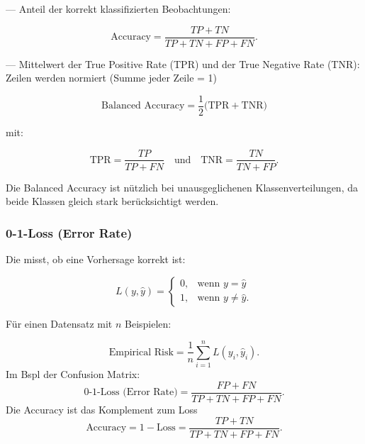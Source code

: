 \begin{formulabox}
 — Anteil der korrekt klassifizierten Beobachtungen:

\begin{equation}
\text{Accuracy} = \frac{TP + TN}{TP + TN + FP + FN}.
\end{equation}
\end{formulabox}

\begin{formulabox}
 — Mittelwert der True Positive Rate (TPR) und der True Negative Rate (TNR):
Zeilen werden normiert (Summe jeder Zeile = 1)

\begin{equation}
\text{Balanced Accuracy} = \frac{1}{2} \big( \text{TPR} + \text{TNR} \big)
\end{equation}

mit:

\begin{equation}
\text{TPR} = \frac{TP}{TP + FN}
\quad \text{und} \quad
\text{TNR} = \frac{TN}{TN + FP}.
\end{equation}
\end{formulabox}

\begin{statementbox}[Hinweis]
Die Balanced Accuracy ist nützlich bei unausgeglichenen Klassenverteilungen, da beide Klassen gleich stark berücksichtigt werden.
\end{statementbox}



\subsubsection{0-1-Loss (Error Rate)}
\begin{contentbox}


Die  misst, ob eine Vorhersage korrekt ist:

\begin{equation}
L(y, \hat{y}) =
\begin{cases}
0, & \text{wenn } y = \hat{y} \\
1, & \text{wenn } y \neq \hat{y}.
\end{cases}
\end{equation}

Für einen Datensatz mit $n$ Beispielen:

\begin{equation}
\text{Empirical Risk} = \frac{1}{n} \sum_{i=1}^{n} L(y_i, \hat{y}_i).
\end{equation}
Im Bspl der Confusion Matrix:
\begin{equation}
\text{0-1-Loss (Error Rate)} = \frac{FP + FN}{TP + TN + FP + FN}.
\end{equation}
Die Accuracy ist das Komplement zum Loss
\begin{equation}
    \text{Accuracy} = 1 - \text{Loss} = \frac{TP + TN}{TP + TN + FP + FN}.
\end{equation}
\end{contentbox}

